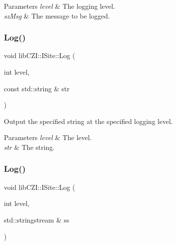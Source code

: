 \begin{DoxyParams}{Parameters}
{\em level} & The logging level. \\
\hline
{\em sz\+Msg} & The message to be logged. \\
\hline
\end{DoxyParams}
\mbox{\label{classlib_c_z_i_1_1_i_site_af879b88237db67ebf48f9c48fc15f57f}} 
\subsubsection{\texorpdfstring{Log()}{Log()}\hspace{0.1cm}{\footnotesize\ttfamily [2/3]}}
{\footnotesize\ttfamily void lib\+C\+Z\+I\+::\+I\+Site\+::\+Log (\begin{DoxyParamCaption}\item[{int}]{level,  }\item[{const std\+::string \&}]{str }\end{DoxyParamCaption})\hspace{0.3cm}{\ttfamily [inline]}}

Output the specified string at the specified logging level. 
\begin{DoxyParams}{Parameters}
{\em level} & The level. \\
\hline
{\em str} & The string. \\
\hline
\end{DoxyParams}
\mbox{\label{classlib_c_z_i_1_1_i_site_a3485af37a7034750ee9d90efa9fcf2c7}} 
\subsubsection{\texorpdfstring{Log()}{Log()}\hspace{0.1cm}{\footnotesize\ttfamily [3/3]}}
{\footnotesize\ttfamily void lib\+C\+Z\+I\+::\+I\+Site\+::\+Log (\begin{DoxyParamCaption}\item[{int}]{level,  }\item[{std\+::stringstream \&}]{ss }\end{DoxyParamCaption})\hspace{0.3cm}{\ttfamily [inline]}}

